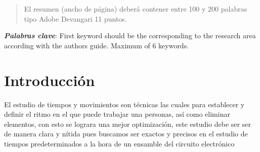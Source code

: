     
    
    \begin{abstract}
    \noindent 
    El resumen (ancho de página) deberá contener entre 100 y 200 palabras tipo Adobe Devangari 11 puntos.
    
    \end{abstract}
    \textbf{\textit{Palabras clave}}: {First keyword should be the corresponding to the research area according with the authors guide. Maximum of 6 keywords.}
    
    \section{Introducción}
        El estudio de tiempos y movimientos son técnicas las cuales para establecer y definir el ritmo en el que puede trabajar una personas, así como eliminar elementos, con esto se lograra una mejor optimización, este estudio debe ser ser de manera clara y nítida pues buscamos ser exactos y precisos en el estudio de tiempos predeterminados a la hora de un ensamble del circuito electrónico
    
